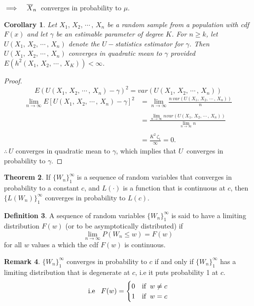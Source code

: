 \documentclass[12pt,a4paper]{report}
\theoremstyle{definition}
\newtheorem{thm}{Theorem}[section]
\newtheorem{defn}[thm]{Definition}
\newtheorem{remark}[thm]{Remark}
\theoremstyle{plain}
\newtheorem{coro}[thm]{Corollary}
\begin{document}
$\implies \hspace{0.3cm} \overline{X}_n\,$ converges in probability to $\mu$.\\


\begin{coro}
Let $X_1,\, X_2, \, \cdots\, , \, X_n$ be a random sample from a population with cdf $F(x)$ and let $\gamma$ be an estimable parameter of degree $K$. For $n\geq k$, let $U(X_1, \, X_2, \, \cdots\, , \, X_n)$ denote the $U-$statistics estimator for $\gamma$. Then $U(X_1, \, X_2, \, \cdots\, , \, X_n)$ converges in quadratic mean to $\gamma$ provided $E\left(h^2(X_1, \, X_2, \, \cdots\, , \, X_K)\right) < \infty$.
\end{coro}


\begin{proof}
$$E\left(U(X_1, \, X_2, \, \cdots\, , \, X_n) - \gamma\right)^2 = var\left(U(X_1, \, X_2, \, \cdots\, , \, X_n)\right)$$
\begin{align*}
\lim_{n\rightarrow\infty}E\left[U(X_1, \, X_2, \, \cdots\, , \, X_n) - \gamma\right]^2 & = \lim_{n\rightarrow \infty}\frac{n\, var\left(U(X_1, \, X_2, \, \cdots\, , \, X_n)\right)}{n}\\\\
& = \frac{\lim_{n\rightarrow\infty} n var\left(U(X_1, \, X_2, \, \cdots\, , \, X_n)\right)}{\lim_{n\rightarrow\infty} n}\\\\
& = \frac{K^2\, \zeta_1}{\infty}
 = 0.
\end{align*}
$\therefore\, U$ converges in quadratic mean to $\gamma$, which implies that $U\,$ converges in probability to $\gamma$.
\end{proof}



\begin{thm}
If $\{W_n\}^{\infty}_1$ is a sequence of random variables that converges in probability to a constant $c$, and $L(\cdot)$ is a function that is continuous at $c$, then $\{L(W_n)\}^{\infty}_1$ converges in probability to $L(c)$.
\end{thm}


\begin{defn}
A sequence of random variables $\{W_n\}^{\infty}_1$ is said to have a limiting distribution $F(w)$ (or to be asymptotically distributed) if
$$\lim_{n\rightarrow \infty}P\left(W_n \leq w\right) = F(w)$$
for all $w$ values a which the cdf $F(w)$ is continuous.
\end{defn}


\begin{remark}
$\{W_n\}^{\infty}_{1}$ converges in probability to $c$ if and only if $\{W_n\}^{\infty}_1$ has a limiting distribution that is degenerate at $c$, i.e it puts probability 1 at $c$.
$$\text{i.e}\hspace{0.3cm} F(w) =
\begin{cases}
0 & \text{if}\hspace{0.2cm} w\neq c\\
1 & \text{if}\hspace{0.2cm} w =c\\
\end{cases}$$
\end{remark}
\end{document}
